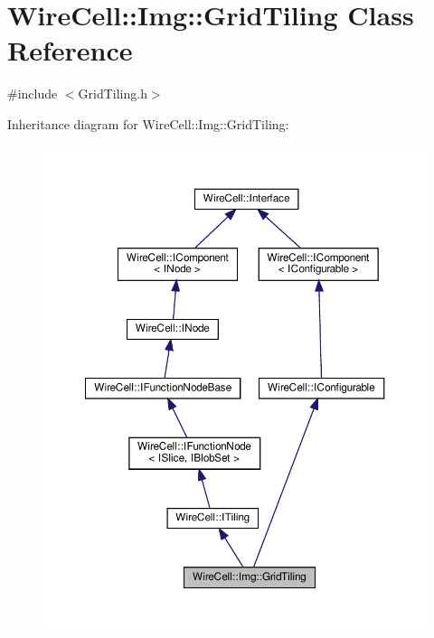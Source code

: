 \hypertarget{class_wire_cell_1_1_img_1_1_grid_tiling}{}\section{Wire\+Cell\+:\+:Img\+:\+:Grid\+Tiling Class Reference}
\label{class_wire_cell_1_1_img_1_1_grid_tiling}


{\ttfamily \#include $<$Grid\+Tiling.\+h$>$}



Inheritance diagram for Wire\+Cell\+:\+:Img\+:\+:Grid\+Tiling\+:
\nopagebreak
\begin{figure}[H]
\begin{center}
\leavevmode
\includegraphics[width=350pt]{class_wire_cell_1_1_img_1_1_grid_tiling__inherit__graph}
\end{center}
\end{figure}


